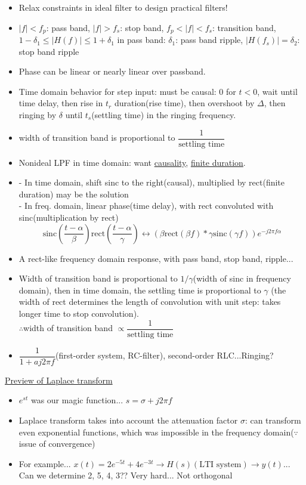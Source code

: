 \documentclass{article}
\newcommand{\rect}[1]{\mathrm{rect}\left(#1\right)}
\newcommand{\sinc}[1]{\mathrm{sinc}\left(#1\right)}
\begin{document}
\begin{itemize}
    \item Relax constraints in ideal filter to design practical filters!
    \item $|f|<f_p$: pass band, $|f|>f_s$: stop band, $f_p < |f| < f_s$: transition band, $1-\delta_1 \leq |H(f)| \leq 1+\delta_1$ in pass band: $\delta_1$: pass band ripple, $|H(f_s)|=\delta_2$: stop band ripple
    \item Phase can be linear or nearly linear over passband.
    \item Time domain behavior for step input: must be causal: 0 for $t<0$, wait until time delay, then rise in $t_r$ duration(rise time), then overshoot by $\Delta$, then ringing by $\delta$ until $t_s$(settling time) in the ringing frequency.
    \item width of transition band is proportional to $\dfrac{1}{\text{settling time}}$
    \item Nonideal LPF in time domain: want \underline{causality}, \underline{finite duration}.
    \item - In time domain, shift sinc to the right(causal), multiplied by rect(finite duration) may be the solution\\- In freq. domain, linear phase(time delay), with rect convoluted with sinc(multiplication by rect)
    \[\sinc{\frac{t-\alpha}{\beta}}\rect{\frac{t-\alpha}{\gamma}}\leftrightarrow (\beta\rect{\beta f}*\gamma\sinc{\gamma f})e^{-j2\pi f\alpha}\]
    \item A rect-like frequency domain response, with pass band, stop band, ripple...
    \item Width of transition band is proportional to $1/\gamma$(width of sinc in frequency domain), then in time domain, the settling time is proportional to $\gamma$ (the width of rect determines the length of convolution with unit step: takes longer time to stop convolution).\\
    $\therefore$width of transition band $\propto\dfrac{1}{\text{settling time}}$
    \item $\dfrac{1}{1+aj2\pi f}$(first-order system, RC-filter), second-order RLC...Ringing?
\end{itemize}
\underline{Preview of Laplace transform}
\begin{itemize}
    \item $e^{st}$ was our magic function... $s=\sigma+j2\pi f$
    \item Laplace transform takes into account the attenuation factor $\sigma$: can transform even exponential functions, which was impossible in the frequency domain($\because$ issue of convergence)
    \item For example... $x(t)=2e^{-5t}+4e^{-3t}\rightarrow H(s)(\text{LTI system})\rightarrow y(t)$... Can we determine 2, 5, 4, 3?? Very hard... Not orthogonal
\end{itemize}
\end{document}
